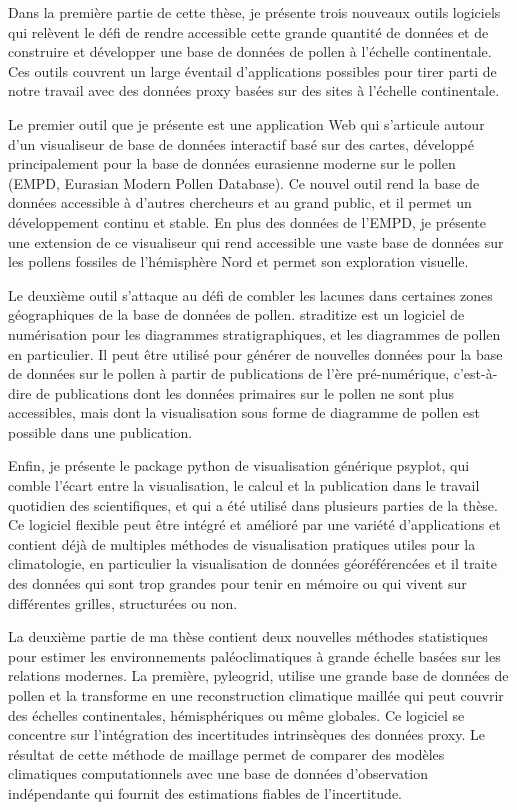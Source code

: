 \documentclass[
11pt, %
english, %
singlespacing, %
headsepline, %
]{MastersDoctoralThesis} %
\begin{document}
\begin{NoHyper}
\begin{thesisabstract}[]
Dans la première partie de cette thèse, je présente trois nouveaux outils logiciels qui relèvent le défi de rendre accessible cette grande quantité de données et de construire et développer une base de données de pollen à l'échelle continentale. Ces outils couvrent un large éventail d'applications possibles pour tirer parti de notre travail avec des données proxy basées sur des sites à l'échelle continentale.

Le premier outil que je présente est une application Web qui s'articule autour d'un visualiseur de base de données interactif basé sur des cartes, développé principalement pour la base de données eurasienne moderne sur le pollen (EMPD, Eurasian Modern Pollen Database). Ce nouvel outil rend la base de données accessible à d'autres chercheurs et au grand public, et il permet un développement continu et stable. En plus des données de l'EMPD, je présente une extension de ce visualiseur qui rend accessible une vaste base de données sur les pollens fossiles de l'hémisphère Nord et permet son exploration visuelle.

Le deuxième outil s'attaque au défi de combler les lacunes dans certaines zones géographiques de la base de données de pollen. straditize est un logiciel de numérisation pour les diagrammes stratigraphiques, et les diagrammes de pollen en particulier. Il peut être utilisé pour générer de nouvelles données pour la base de données sur le pollen à partir de publications de l’ère pré-numérique, c'est-à-dire de publications dont les données primaires sur le pollen ne sont plus accessibles, mais dont la visualisation sous forme de diagramme de pollen est possible dans une publication.

Enfin, je présente le package python de visualisation générique psyplot, qui comble l'écart entre la visualisation, le calcul et la publication dans le travail quotidien des scientifiques, et qui a été utilisé dans plusieurs parties de la thèse. Ce logiciel flexible peut être intégré et amélioré par une variété d'applications et contient déjà de multiples méthodes de visualisation pratiques utiles pour la climatologie, en particulier la visualisation de données géoréférencées et il traite des données qui sont trop grandes pour tenir en mémoire ou qui vivent sur différentes grilles, structurées ou non.

La deuxième partie de ma thèse contient deux nouvelles méthodes statistiques pour estimer les environnements paléoclimatiques à grande échelle basées sur les relations modernes. La première, pyleogrid, utilise une grande base de données de pollen et la transforme en une reconstruction climatique maillée qui peut couvrir des échelles continentales, hémisphériques ou même globales. Ce logiciel se concentre sur l'intégration des incertitudes intrinsèques des données proxy. Le résultat de cette méthode de maillage permet de comparer des modèles climatiques computationnels avec une base de données d'observation indépendante qui fournit des estimations fiables de l'incertitude.


\end{thesisabstract}
\end{NoHyper}
\end{document}
